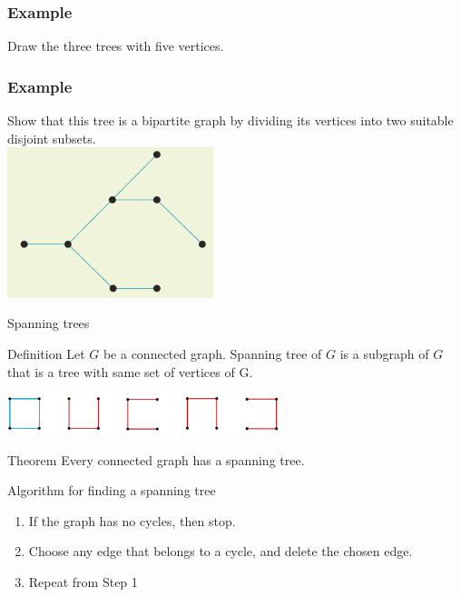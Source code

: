 \documentclass[
	11pt, %
]{beamer}
\begin{document}
\begin{frame}[t]
    \frametitle{Example}
    Draw the three trees with five vertices.
\end{frame}

\begin{frame}[t]
    \frametitle{Example}
    Show that this tree is a bipartite graph by dividing its vertices into two suitable disjoint subsets.\\
    \includegraphics[width=6cm]{Tree2.png}
\end{frame}

\begin{frame}{Spanning trees}
    \begin{block}{Definition}
        Let $G$ be a connected graph. Spanning tree of $G$ is a subgraph of $G$ that is a tree with same set of vertices of G.
        \begin{center}
            \includegraphics[width = 8cm]{Span.png}\\
        \end{center}
    \end{block}
    \begin{block}{Theorem}
        Every connected graph has a spanning tree.
    \end{block}
\end{frame}

\begin{frame}{Algorithm for finding a spanning tree}
    \begin{enumerate}
        \item If the graph has no cycles, then stop.
        \item Choose any edge that belongs to a cycle, and delete the chosen edge.
        \item Repeat from Step 1
    \end{enumerate}
\end{frame}
\end{document}
